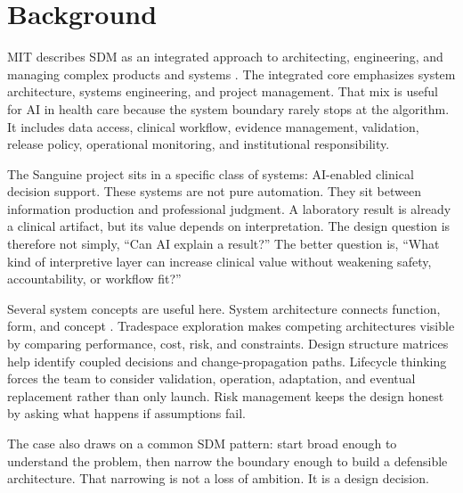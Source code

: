 \section{Background}

MIT describes SDM as an integrated approach to architecting, engineering, and managing complex products and systems \cite{mit_sdm_what,mit_sdm_core}. The integrated core emphasizes system architecture, systems engineering, and project management. That mix is useful for AI in health care because the system boundary rarely stops at the algorithm. It includes data access, clinical workflow, evidence management, validation, release policy, operational monitoring, and institutional responsibility.

The Sanguine project sits in a specific class of systems: AI-enabled clinical decision support. These systems are not pure automation. They sit between information production and professional judgment. A laboratory result is already a clinical artifact, but its value depends on interpretation. The design question is therefore not simply, ``Can AI explain a result?'' The better question is, ``What kind of interpretive layer can increase clinical value without weakening safety, accountability, or workflow fit?''

Several system concepts are useful here. System architecture connects function, form, and concept \cite{crawley2015system}. Tradespace exploration makes competing architectures visible by comparing performance, cost, risk, and constraints. Design structure matrices help identify coupled decisions and change-propagation paths. Lifecycle thinking forces the team to consider validation, operation, adaptation, and eventual replacement rather than only launch. Risk management keeps the design honest by asking what happens if assumptions fail.

The case also draws on a common SDM pattern: start broad enough to understand the problem, then narrow the boundary enough to build a defensible architecture. That narrowing is not a loss of ambition. It is a design decision.
